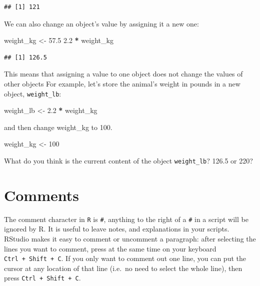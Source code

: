 \documentclass[]{book}
\newenvironment{Shaded}{\begin{snugshade}}{\end{snugshade}}
\newcommand{\DecValTok}[1]{\textcolor[rgb]{0.00,0.00,0.81}{#1}}
\newcommand{\FloatTok}[1]{\textcolor[rgb]{0.00,0.00,0.81}{#1}}
\newcommand{\NormalTok}[1]{#1}
\newcommand{\OperatorTok}[1]{\textcolor[rgb]{0.81,0.36,0.00}{\textbf{#1}}}
\newcommand{\StringTok}[1]{\textcolor[rgb]{0.31,0.60,0.02}{#1}}
\begin{document}
\begin{verbatim}
## [1] 121
\end{verbatim}

We can also change an object's value by assigning it a new one:

\begin{Shaded}
\begin{Highlighting}[]
\NormalTok{weight_kg <-}\StringTok{ }\FloatTok{57.5}
\FloatTok{2.2} \OperatorTok{*}\StringTok{ }\NormalTok{weight_kg}
\end{Highlighting}
\end{Shaded}

\begin{verbatim}
## [1] 126.5
\end{verbatim}

This means that assigning a value to one object does not change the values of other objects For example, let's store the animal's weight in pounds in a new object, \texttt{weight\_lb}:

\begin{Shaded}
\begin{Highlighting}[]
\NormalTok{weight_lb <-}\StringTok{ }\FloatTok{2.2} \OperatorTok{*}\StringTok{ }\NormalTok{weight_kg}
\end{Highlighting}
\end{Shaded}

and then change weight\_kg to 100.

\begin{Shaded}
\begin{Highlighting}[]
\NormalTok{weight_kg <-}\StringTok{ }\DecValTok{100}
\end{Highlighting}
\end{Shaded}

What do you think is the current content of the object \texttt{weight\_lb}? 126.5 or 220?

\hypertarget{comments}{%
\section{Comments}\label{comments}}

The comment character in \texttt{R} is \texttt{\#}, anything to the right of a \texttt{\#} in a script will be ignored by R. It is useful to leave notes, and explanations in your scripts. RStudio makes it easy to comment or uncomment a paragraph: after selecting the lines you want to comment, press at the same time on your keyboard \texttt{Ctrl\ +\ Shift\ +\ C}. If you only want to comment out one line, you can put the cursor at any location of that line (i.e.~no need to select the whole line), then press \texttt{Ctrl\ +\ Shift\ +\ C}.
\end{document}

